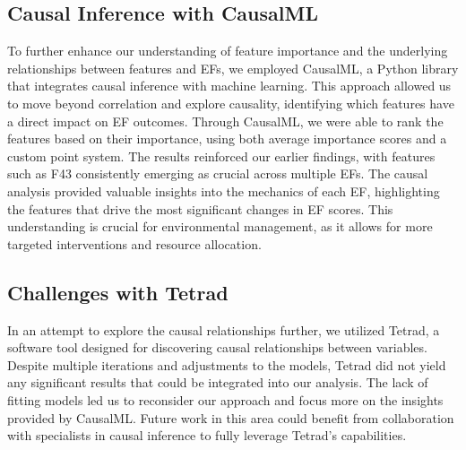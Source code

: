 \documentclass[12pt,letterpaper]{article}
\begin{document}
\subsection{Causal Inference with CausalML}
To further enhance our understanding of feature importance and the underlying relationships between features and \acp{EF}, we employed CausalML, a Python library that integrates causal inference with machine learning.
This approach allowed us to move beyond correlation and explore causality, identifying which features have a direct impact on \ac{EF} outcomes.
Through CausalML, we were able to rank the features based on their importance, using both average importance scores and a custom point system.
The results reinforced our earlier findings, with features such as F43 consistently emerging as crucial across multiple \acp{EF}.
The causal analysis provided valuable insights into the mechanics of each \ac{EF}, highlighting the features that drive the most significant changes in \ac{EF} scores.
This understanding is crucial for environmental management, as it allows for more targeted interventions and resource allocation.

\subsection{Challenges with Tetrad}
In an attempt to explore the causal relationships further, we utilized Tetrad, a software tool designed for discovering causal relationships between variables.
Despite multiple iterations and adjustments to the models, Tetrad did not yield any significant results that could be integrated into our analysis.
The lack of fitting models led us to reconsider our approach and focus more on the insights provided by CausalML.
Future work in this area could benefit from collaboration with specialists in causal inference to fully leverage Tetrad's capabilities.
\end{document}
